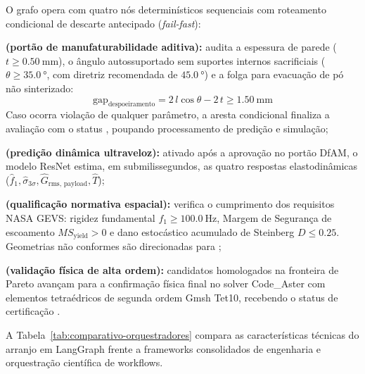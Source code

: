 O grafo opera com quatro nós determinísticos sequenciais com roteamento condicional de descarte antecipado (\textit{fail-fast}):
\begin{alineas}
  \item \textbf{ (portão de manufaturabilidade aditiva):} audita a espessura de parede ($t \ge \SI{0.50}{\milli\metre}$), o ângulo autossuportado sem suportes internos sacrificiais ($\theta \ge \SI{35.0}{\degree}$, com diretriz recomendada de $\SI{45.0}{\degree}$) e a folga para evacuação de pó não sinterizado:
  \begin{equation}
    \text{gap}_{\text{despoeiramento}} = 2\, l \cos\theta - 2\, t \ge \SI{1.50}{\milli\metre}
    \label{eq:gap}
  \end{equation}
  Caso ocorra violação de qualquer parâmetro, a aresta condicional  finaliza a avaliação com o status , poupando processamento de predição e simulação;
  \item \textbf{ (predição dinâmica ultraveloz):} ativado após a aprovação no portão DfAM, o modelo ResNet estima, em submilissegundos, as quatro respostas elastodinâmicas ($\hat{f}_1, \hat{\sigma}_{3\sigma}, \hat{G}_{\text{rms, payload}}, \hat{T}$);
  \item \textbf{ (qualificação normativa espacial):} verifica o cumprimento dos requisitos NASA GEVS: rigidez fundamental $f_1 \ge \SI{100.0}{\hertz}$, Margem de Segurança de escoamento $MS_{\text{yield}} > 0$ e dano estocástico acumulado de Steinberg $D \le \num{0.25}$. Geometrias não conformes são direcionadas para ;
  \item \textbf{ (validação física de alta ordem):} candidatos homologados na fronteira de Pareto avançam para a confirmação física final no solver Code\_Aster com elementos tetraédricos de segunda ordem Gmsh Tet10, recebendo o status de certificação .
\end{alineas}

A Tabela~\ref{tab:comparativo-orquestradores} compara as características técnicas do arranjo em LangGraph frente a frameworks consolidados de engenharia e orquestração científica de workflows.

